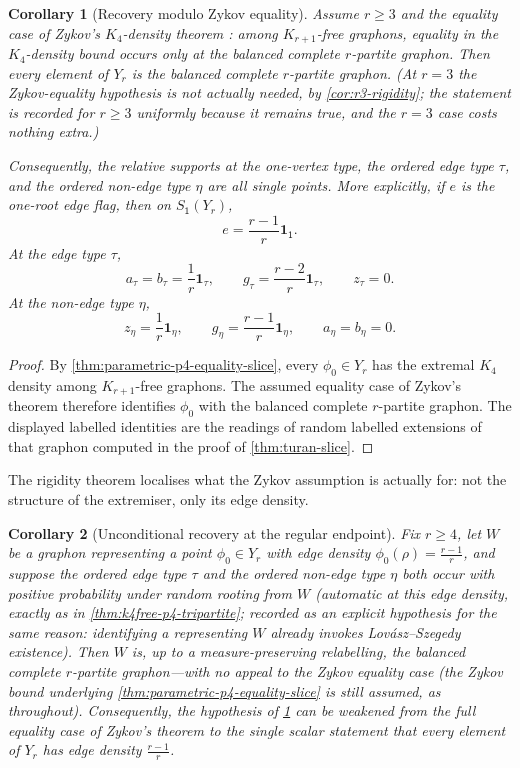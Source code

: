 \documentclass[11pt]{article}
\newtheorem{corollary}[corollary]{Corollary}
\theoremstyle{definition}
\newcommand{\one}{\mathbf 1}
\newcommand{\vtype}{\mathsf{1}}
\begin{document}
\begin{corollary}[Recovery modulo Zykov equality]
\label{cor:parametric-p4-turan-recovery}
Assume $r\ge3$ and the equality case of Zykov's $K_4$-density theorem
\cite{Zykov1949}: among $K_{r+1}$-free graphons, equality in the $K_4$-density bound
occurs only at the balanced complete $r$-partite graphon.  Then every element of $Y_r$
is the balanced complete $r$-partite graphon.  (At $r=3$ the Zykov-equality hypothesis
is not actually needed, by \cref{cor:r3-rigidity}; the statement is recorded for
$r\ge3$ uniformly because it remains true, and the $r=3$ case costs nothing extra.)

Consequently, the relative supports at the one-vertex type, the ordered edge type
$\tau$, and the ordered non-edge type $\eta$ are all single points.  More explicitly, if
$e$ is the one-root edge flag, then on $S_{\vtype}(Y_r)$,
\[
  e=\frac{r-1}{r}\one_{\vtype} .
\]
At the edge type $\tau$,
\[
  a_\tau=b_\tau=\frac1r\one_\tau,
  \qquad
  g_\tau=\frac{r-2}{r}\one_\tau,
  \qquad
  z_\tau=0 .
\]
At the non-edge type $\eta$,
\[
  z_\eta=\frac1r\one_\eta,
  \qquad
  g_\eta=\frac{r-1}{r}\one_\eta,
  \qquad
  a_\eta=b_\eta=0 .
\]
\end{corollary}

\begin{proof}
By \cref{thm:parametric-p4-equality-slice}, every $\phi_0\in Y_r$ has the extremal
$K_4$ density among $K_{r+1}$-free graphons.  The assumed equality case of Zykov's
theorem therefore identifies $\phi_0$ with the balanced complete $r$-partite graphon.
The displayed labelled identities are the readings of random labelled extensions of that
graphon computed in the proof of \cref{thm:turan-slice}.
\end{proof}

The rigidity theorem localises what the Zykov assumption is actually for: not the
structure of the extremiser, only its edge density.

\begin{corollary}[Unconditional recovery at the regular endpoint]\label{cor:top-endpoint-recovery}
Fix $r\ge4$, let $W$ be a graphon representing a point $\phi_0\in Y_r$ with edge density
$\phi_0(\rho)=\frac{r-1}r$, and suppose the ordered edge type $\tau$ and the ordered
non-edge type $\eta$ both occur with positive probability under random rooting from $W$
(automatic at this edge density, exactly as in \cref{thm:k4free-p4-tripartite}; recorded
as an explicit hypothesis for the same reason: identifying a representing $W$ already
invokes Lov\'asz--Szegedy existence).  Then $W$ is, up to a measure-preserving
relabelling, the balanced complete $r$-partite graphon---with no appeal to the Zykov
\emph{equality} case (the Zykov \emph{bound} underlying
\cref{thm:parametric-p4-equality-slice} is still assumed, as throughout).  Consequently,
the hypothesis of \cref{cor:parametric-p4-turan-recovery} can be weakened from the full
equality case of Zykov's theorem to the single scalar statement that every element of
$Y_r$ has edge density $\frac{r-1}r$.
\end{corollary}
\end{document}
